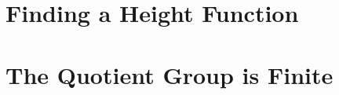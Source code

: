 \documentclass[11pt, oneside,a4paper]{article}
\theoremstyle{definition}
\begin{document}
\clearpage
\section{Finding a Height Function}%
\label{sec:finding_a_height_function}


\clearpage
\section{The Quotient Group is Finite}%
\label{sec:the_quotient_group_is_finite}




\clearpage
\nocite{*}

\end{document}
